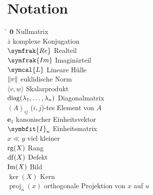 \chapter*{Notation}
\begin{tabbing}
    \hspace{4cm} \= \kill
    \(\symbf{0}\) \> Nullmatrix \\
    \(\overline{z}\) \>  komplexe Konjugation \\
    \(\symfrak{Re}\) \>  Realteil \\
    \(\symfrak{Im}\) \>  Imaginärteil \\
    \(\symcal{L}\)   \>  Lineare Hülle \\ 
    \(\lVert v\rVert\)     \>  euklidische Norm \\ 
    \(\langle v,w \rangle\) \> Skalarprodukt \\
    \(\operatorname{diag}(\lambda_1,\ldots,\lambda_n)\) \> Diagonalmatrix \\
    \({(A)}_{ij}\) \> (\(i,j\))-tes Element von \(A\) \\  
    \(\symbf{e}_{1}\) \> kanonischer Einheitsvektor \\
    \(\symbfit{I}_{n}\) \> Einheitsmatrix \\
    \(x \ll y\) \> viel kleiner \\
    \(\operatorname{rg}(X)\) \> Rang \\
    \(\operatorname{df}(X)\) \> Defekt \\
    \(\operatorname{Im}(X)\) \> Bild \\
    \(\ker(X)\) \> Kern \\
    \(\operatorname{proj}_{u}(x)\) \> orthogonale Projektion von \(x\) auf \(u\) 
\end{tabbing}

\enlargethispage{\baselineskip}